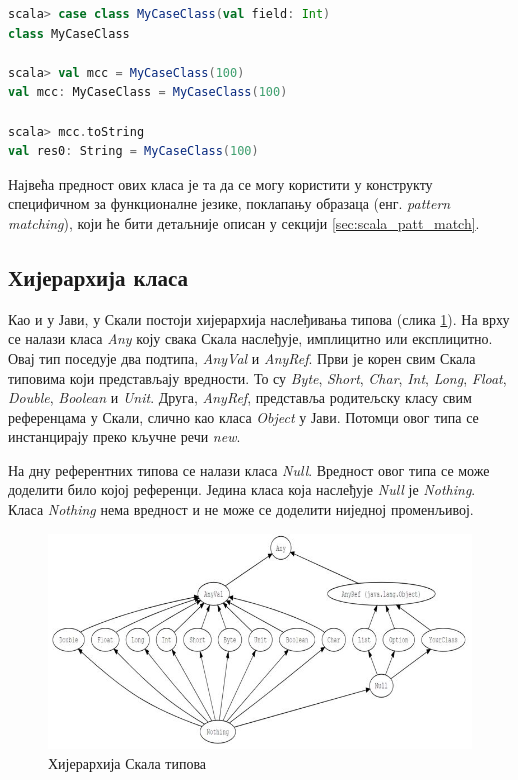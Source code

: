 \documentclass[12pt,oneside]{memoir}
\begin{document}
\begin{lstlisting}[language=Scala, caption={Пример коришћења \textit{case} класа}, label={lst:scala_oop_case_class_example}]
scala> case class MyCaseClass(val field: Int)
class MyCaseClass

scala> val mcc = MyCaseClass(100)
val mcc: MyCaseClass = MyCaseClass(100)

scala> mcc.toString
val res0: String = MyCaseClass(100)
\end{lstlisting}

Највећа предност ових класа је та да се могу користити у конструкту специфичном за функционалне језике, поклапању образаца (енг. \textit{pattern matching}), који ће бити детаљније описан у секцији \ref{sec:scala_patt_match}. \cite{scala_prog}

\subsection{Хијерархија класа}
\label{subsec:scala_class_hier}

Као и у Јави, у Скали постоји хијерархија наслеђивања типова (слика \ref{fig:scala_types_hier}). На врху се налази класа \textit{Any} коју свака Скала наслеђује, имплицитно или експлицитно. Овај тип поседује два подтипа, \textit{AnyVal} и \textit{AnyRef}. Први је корен свим Скала типовима који представљају вредности. То су \textit{Byte}, \textit{Short}, \textit{Char}, \textit{Int}, \textit{Long}, \textit{Float}, \textit{Double}, \textit{Boolean} и \textit{Unit}. Друга, \textit{AnyRef}, представља родитељску класу свим референцама у Скали, слично као класа \textit{Object} у Јави. Потомци овог типа се инстанцирају преко кључне речи \textit{new}. \cite{scala_prog}

На дну референтних типова се налази класа \textit{Null}. Вредност овог типа се може доделити било којој референци. Једина класа која наслеђује \textit{Null} је \textit{Nothing}. Класа \textit{Nothing} нема вредност и не може се доделити ниједној променљивој.

\begin{figure}[!ht]
  \centering
  \includegraphics[width=1\textwidth]{pictures/scala-type-hierarchy.jpg}
  \caption{Хијерархија Скала типова}
  \label{fig:scala_types_hier}
\end{figure}
\end{document}
